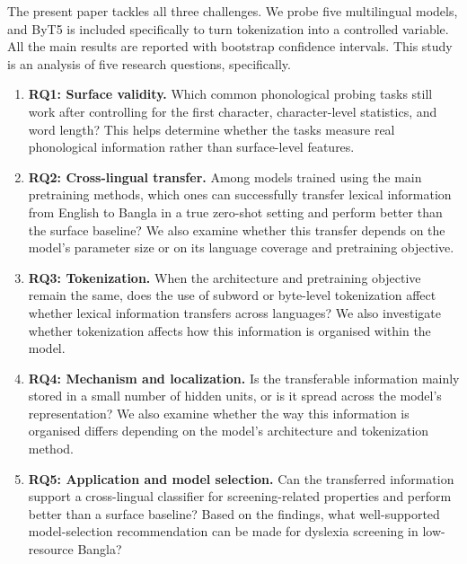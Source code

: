 \documentclass[preprint,12pt,authoryear]{elsarticle}
\begin{document}
The present paper tackles all three challenges. We probe five multilingual models, and ByT5 is included specifically to turn tokenization into a controlled variable. All the main results are reported with bootstrap confidence intervals. This study is an analysis of five research questions, specifically.
\begin{enumerate}
\item \textbf{RQ1: Surface validity.} Which common phonological probing tasks still work after controlling for the first character, character-level statistics, and word length? This helps determine whether the tasks measure real phonological information rather than surface-level features.
\item \textbf{RQ2: Cross-lingual transfer.} Among models trained using the main pretraining methods, which ones can successfully transfer lexical information from English to Bangla in a true zero-shot setting and perform better than the surface baseline? We also examine whether this transfer depends on the model's parameter size or on its language coverage and pretraining objective.
\item \textbf{RQ3: Tokenization.} When the architecture and pretraining objective remain the same, does the use of subword or byte-level tokenization affect whether lexical information transfers across languages? We also investigate whether tokenization affects how this information is organised within the model.
\item \textbf{RQ4: Mechanism and localization.} Is the transferable information mainly stored in a small number of hidden units, or is it spread across the model's representation? We also examine whether the way this information is organised differs depending on the model's architecture and tokenization method.
\item \textbf{RQ5: Application and model selection.} Can the transferred information support a cross-lingual classifier for screening-related properties and perform better than a surface baseline? Based on the findings, what well-supported model-selection recommendation can be made for dyslexia screening in low-resource Bangla?
\end{enumerate}
\end{document}
